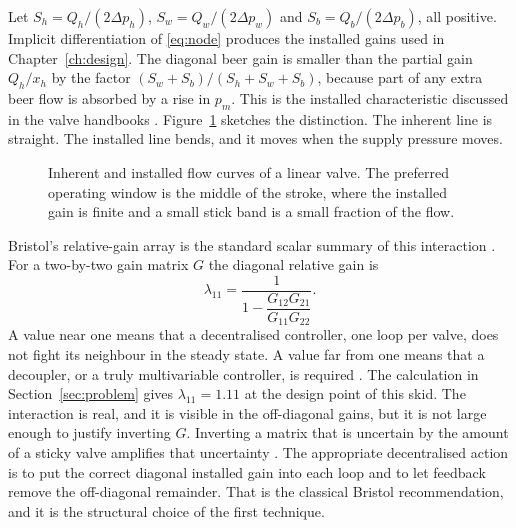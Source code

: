 Let $S_h = Q_h/(2\Delta p_h)$, $S_w = Q_w/(2\Delta p_w)$ and $S_b = Q_b/(2\Delta p_b)$, all positive. Implicit differentiation of \eqref{eq:node} produces the installed gains used in Chapter~\ref{ch:design}. The diagonal beer gain is smaller than the partial gain $Q_h/x_h$ by the factor $(S_w+S_b)/(S_h+S_w+S_b)$, because part of any extra beer flow is absorbed by a rise in $p_m$. This is the installed characteristic discussed in the valve handbooks \cite{fisher2005valve,iec60534}. Figure~\ref{fig:installed} sketches the distinction. The inherent line is straight. The installed line bends, and it moves when the supply pressure moves.

\begin{figure}[htbp]
\centering
{}
\caption{Inherent and installed flow curves of a linear valve. The preferred operating window is the middle of the stroke, where the installed gain is finite and a small stick band is a small fraction of the flow.}
\label{fig:installed}
\end{figure}

Bristol's relative-gain array is the standard scalar summary of this interaction \cite{bristol1966rga,skogestad2005multivariable}. For a two-by-two gain matrix $G$ the diagonal relative gain is
\begin{equation}
\label{eq:rga}
\lambda_{11} = \frac{1}{1 - \dfrac{G_{12}G_{21}}{G_{11}G_{22}}}.
\end{equation}
A value near one means that a decentralised controller, one loop per valve, does not fight its neighbour in the steady state. A value far from one means that a decoupler, or a truly multivariable controller, is required \cite{skogestad2005multivariable,seborg2016process}. The calculation in Section~\ref{sec:problem} gives $\lambda_{11}=1.11$ at the design point of this skid. The interaction is real, and it is visible in the off-diagonal gains, but it is not large enough to justify inverting $G$. Inverting a matrix that is uncertain by the amount of a sticky valve amplifies that uncertainty \cite{skogestad2005multivariable,morari1989robust}. The appropriate decentralised action is to put the correct diagonal installed gain into each loop and to let feedback remove the off-diagonal remainder. That is the classical Bristol recommendation, and it is the structural choice of the first technique.

